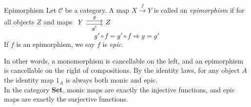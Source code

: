 \begin{definition}{Epimorphism}
  Let $\mathscr{C}$ be a category. A map $X \overset{f}{\to} Y$ is called an \emph{epimorphism} if for all objects $Z$ and maps
  $
  \begin{tikzcd}
    Y \arrow[r,shift left, "g"] \arrow[r,shift right,swap,"g'"] & Z
  \end{tikzcd}
  $
  \[
    g' \circ f = g' \circ f \Rightarrow g = g'
  \]
  If $f$ is an epimorphism, we say $f$ is \emph{epic}.
\end{definition}


In other words, a monomorphism is cancellable on the left, and an epimorphism is cancellable on the right of compositions.
By the identity laws, for any object $A$ the identity map $1_A$ is always both monic and epic.\\
In the category \textbf{Set}, monic maps are exactly the injective functions, and epic maps are exactly the surjective functions.

